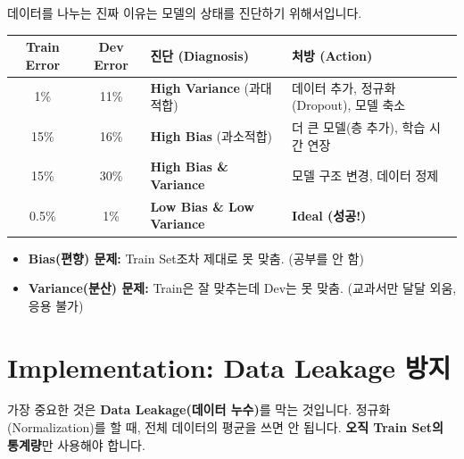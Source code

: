 \documentclass[11pt,a4paper]{book}
\theoremstyle{definition}
\begin{document}
데이터를 나누는 진짜 이유는 모델의 상태를 진단하기 위해서입니다.

\begin{diagnosisbox}[title={성능 진단표 (Human Error $\approx$ 0\% 가정)}]
\begin{center}
\begin{tabular}{c|c|l|l}
\hline
\textbf{Train Error} & \textbf{Dev Error} & \textbf{진단 (Diagnosis)} & \textbf{처방 (Action)} \\ \hline
1\% & 11\% & \textbf{High Variance} (과대적합) & 데이터 추가, 정규화(Dropout), 모델 축소 \\ \hline
15\% & 16\% & \textbf{High Bias} (과소적합) & 더 큰 모델(층 추가), 학습 시간 연장 \\ \hline
15\% & 30\% & \textbf{High Bias \& Variance} & 모델 구조 변경, 데이터 정제 \\ \hline
0.5\% & 1\% & \textbf{Low Bias \& Low Variance} & \textbf{Ideal (성공!)} \\ \hline
\end{tabular}
\end{center}
\end{diagnosisbox}

\begin{itemize}
    \item \textbf{Bias(편향) 문제:} Train Set조차 제대로 못 맞춤. (공부를 안 함)
    \item \textbf{Variance(분산) 문제:} Train은 잘 맞추는데 Dev는 못 맞춤. (교과서만 달달 외움, 응용 불가)
\end{itemize}


\section{Implementation: Data Leakage 방지}

가장 중요한 것은 \textbf{Data Leakage(데이터 누수)}를 막는 것입니다. 정규화(Normalization)를 할 때, 전체 데이터의 평균을 쓰면 안 됩니다. \textbf{오직 Train Set의 통계량}만 사용해야 합니다.
\end{document}
